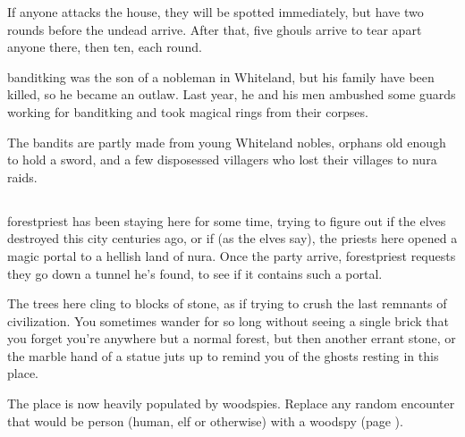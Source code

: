 \begin{multicols}{2}
If anyone attacks the house, they will be spotted immediately, but have two rounds before the undead arrive.
After that, five ghouls arrive to tear apart anyone there, then ten, each round.



\Gls{banditking} was the son of a nobleman in Whiteland, but his family have been killed, so he became an outlaw.
Last year, he and his men ambushed some guards working for \gls{banditking} and took magical rings from their corpses.



The bandits are partly made from young Whiteland nobles, orphans old enough to hold a sword, and a few disposessed villagers who lost their villages to nura raids.

\humansoldier

\subsection{}\label{lostcity}\setcounter{list}{0}

\Gls{forestpriest} has been staying here for some time, trying to figure out if the elves destroyed this city centuries ago, or if (as the elves say), the priests here opened a magic portal to a hellish land of nura.
Once the party arrive, \gls{forestpriest} requests they go down a tunnel he's found, to see if it contains such a portal.

\begin{boxtext}

The trees here cling to blocks of stone, as if trying to crush the last remnants of civilization.  You sometimes wander for so long without seeing a single brick that you forget you're anywhere but a normal forest, but then another errant stone, or the marble hand of a statue juts up to remind you of the ghosts resting in this place.

\end{boxtext}

The place is now heavily populated by woodspies.  Replace any random encounter that would be person (human, elf or otherwise) with a woodspy (page \pageref{woodspy}).

\end{multicols}

